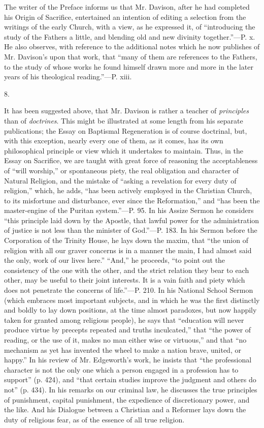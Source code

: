 The writer of the Preface informs us that Mr.
Davison, after he had completed his Origin of Sacrifice, entertained
an intention of editing a selection from the writings of the early
Church, with a view, as he expressed it, of ``introducing the study of
the Fathers a little, and blending old and new divinity together.''—P.
x. He also observes, with reference to the additional notes which he
now publishes of Mr. Davison's upon that work, that ``many of them are
references to the Fathers, to the study of whose works he found
himself drawn more and more in the later years of his theological
reading.''—P. xiii.

8.

It has been suggested above, that Mr. Davison is
rather a teacher of \emph{principles} than of \emph{doctrines}. This
might be illustrated at some length from his separate publications;
the Essay on Baptismal Regeneration is of course doctrinal, but, with
this exception, nearly every one of them, as it comes, has its own
philosophical principle or view which it undertakes to maintain. Thus,
in the Essay on Sacrifice, we are taught with great force of reasoning
the acceptableness of ``will worship,'' or spontaneous piety, the real
obligation and character of Natural Religion, and the mistake of ``asking a revelation for every duty of religion,'' which, he adds, ``has
been actively employed in the Christian Church, to its misfortune and
disturbance, ever since the Reformation,'' and ``has been the
master-engine of the Puritan system.''—P. 95. In his Assize Sermon he
considers ``this principle laid down by the Apostle, that lawful power
for the administration of justice is not less than the minister
of God.''—P. 183. In his Sermon before the Corporation of the Trinity
House, he lays down the maxim, that ``the union of religion with all
our graver concerns is in a manner the main, I had almost said the
only, work of our lives here.'' ``And,'' he proceeds, ``to point out the
consistency of the one with the other, and the strict relation they
bear to each other, may be useful to their joint interests. It is a
vain faith and piety which does not penetrate the concerns of life.''—P.
210. In his National School Sermon (which embraces most important
subjects, and in which he was the first distinctly and boldly to lay
down positions, at the time almost paradoxes, but now happily taken
for granted among religious people), he says that ``education will
never produce virtue by precepts repeated and truths inculcated,'' that
``the power of reading, or the use of it, makes no man either wise or
virtuous,'' and that ``no mechanism as yet has invented the wheel to
make a nation brave, united, or happy.'' In his review of Mr. Edgeworth's
work, he insists that ``the professional character is not the only one
which a person engaged in a profession has to support'' (p. 424), and ``that
certain studies improve the judgment and others do not'' (p. 434). In
his remarks on our criminal law, he discusses the true principles of
punishment, capital punishment, the expedience of discretionary power,
and the like. And his Dialogue between a Christian and a Reformer lays
down the duty of religious fear, as of the essence of all true
religion.

